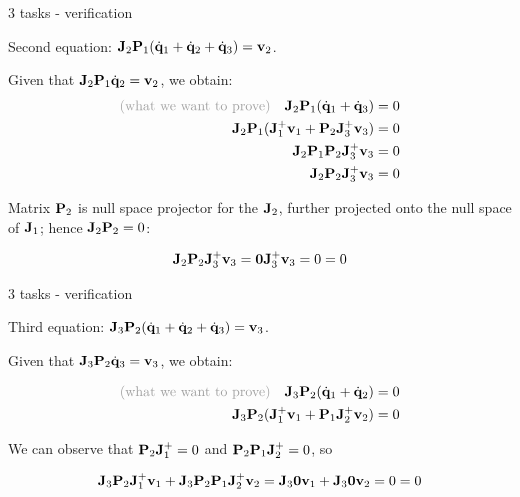 \documentclass{beamer}
\newcommand{\dq} {\dot{\mathbf{q}}}
\begin{document}
\begin{frame}{3 tasks - verification}
	\begin{flushleft}
		
		Second equation: $\bo{J}_2 \bo{P}_1 (\dq_1 + \dq_2 + \dq_3) = \bo{v}_2$.
		
		\bigskip
		
		Given that $\bo{J}_2 \bo{P}_1 \dq_2 = \bo{v}_2$, we obtain:
		\begin{align}
			\textcolor{mygray}{\text{(what we want to prove)}} \ \ \ 
			\bo{J}_2 \bo{P}_1 (\dq_1 + \dq_3) = 0 
			\\
			\bo{J}_2 \bo{P}_1 (\bo{J}_1^+ \bo{v}_1 
			+ 
			\bo{P}_2 \bo{J}_3^+ \bo{v}_3) = 0 
			\\
			 \bo{J}_2 \bo{P}_1 \bo{P}_2 \bo{J}_3^+ \bo{v}_3 = 0  \\
			 \bo{J}_2 \bo{P}_2 \bo{J}_3^+ \bo{v}_3 = 0
		\end{align}
		
		Matrix $\mathbf{P}_2$ is null space projector for the $\mathbf{J}_2$, further projected onto the null space of $\mathbf{J}_1$; hence $\mathbf{J}_2 \mathbf{P}_2 = 0$: 
		
		\begin{align}
			\mathbf{J}_2 \mathbf{P}_2 \mathbf{J}_3^+ \mathbf{v}_3 = 
			\mathbf{0} \mathbf{J}_3^+ \mathbf{v}_3 = 0 = 0
		\end{align}
	
	\end{flushleft}
\end{frame}




\begin{frame}{3 tasks - verification}
	\begin{flushleft}
		
		Third equation: $\bo{J}_3 \bo{P}_2 (\dq_1 + \dq_2 + \dq_3) = \bo{v}_3$.
		
		\bigskip
		
		Given that $\bo{J}_3 \bo{P}_2 \dq_3 = \bo{v}_3$, we obtain:
		
		\begin{align}
			\textcolor{mygray}{\text{(what we want to prove)}} \ \ \ 
			\bo{J}_3 \bo{P}_2 (\dq_1 + \dq_2) = 0 
			\\
			\bo{J}_3 \bo{P}_2 (
			\bo{J}_1^+ \bo{v}_1
			 + 
			 \bo{P}_1 \bo{J}_2^+ \bo{v}_2) = 0 
		\end{align}
		
		We can observe that $\mathbf{P}_2  \mathbf{J}_1^+ = 0$ and $\mathbf{P}_2 \mathbf{P}_1 \mathbf{J}_2^+ = 0$, so
		
		\begin{align}
	\mathbf{J}_3 \mathbf{P}_2\mathbf{J}_1^+ \mathbf{v}_1
	+ 
	\mathbf{J}_3 \mathbf{P}_2 \mathbf{P}_1 \mathbf{J}_2^+ \mathbf{v}_2
	= 
	\mathbf{J}_3 \mathbf{0} \mathbf{v}_1
	+ 
	\mathbf{J}_3 \mathbf{0} \mathbf{v}_2  = 0 = 0
		\end{align}		
		
	\end{flushleft}
\end{frame}
\end{document}
